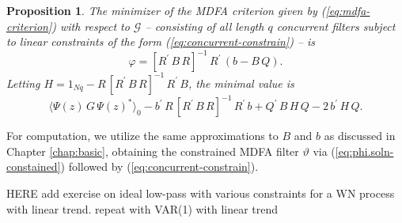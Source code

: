\documentclass[a4paper]{book}
\newtheorem{Proposition}{Proposition}
\begin{document}
\begin{Proposition}
\label{prop:mdfa.quadsoln-constrain}
 The minimizer of the  MDFA criterion given by   (\ref{eq:mdfa-criterion})
 with respect to  $\mathcal{G}$ -- consisting of all length $q$ concurrent filters 
 subject to  linear constraints of the form (\ref{eq:concurrent-constrain}) -- is
\begin{equation}
\label{eq:phi.soln-constained}
 \varphi =  { \left[ R^{\prime} \, B \, R \right] }^{-1} \, R^{\prime} \,
 \left( b - B \, Q \right).
\end{equation}
  Letting $H = 1_{Nq} - R \,   { \left[ R^{\prime} \, B \, R \right] }^{-1} \,
  R^{\prime} \, B$, the minimal value is  
\begin{equation}
\label{eq:opt.val.mdfa-constrained}
{ \langle \Psi (z) \, G \, { \Psi (z) }^* \rangle }_0 - b^{\prime} \, 
R \, { \left[ R^{\prime} \, B \, R \right] }^{-1} \, R^{\prime} \,  b
	+ Q^{\prime} \, B \, H \, Q - 2 \, b^{\prime} \, H \, Q.
\end{equation}
\end{Proposition}

For computation, we utilize the same approximations to $B$ and $b$ as discussed 
in  Chapter \ref{chap:basic},
 obtaining the constrained MDFA filter $\vartheta$ via (\ref{eq:phi.soln-constained})
 followed by (\ref{eq:concurrent-constrain}).

HERE  add exercise on ideal low-pass with various constraints 
  for a WN process with linear trend.  
 repeat with VAR(1) with linear trend
\end{document}
